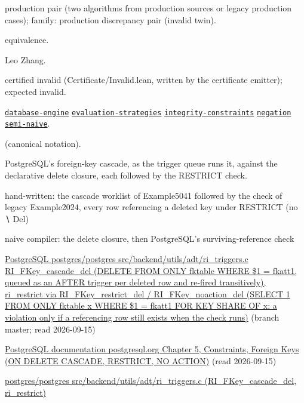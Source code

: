 \documentclass[10pt]{article}
\begin{document}
\begin{description}[leftmargin=2.6cm,style=nextline,itemsep=1pt]

\item[Category] production pair (two algorithms from production sources or legacy production cases); family: production discrepancy pair (invalid twin).

\item[Kind] equivalence.

\item[Contributors] Leo Zhang.

\item[Status] certified invalid (Certificate/Invalid.lean, written by the certificate emitter); expected invalid.

\item[Tags] \hyperref[tag:database-engine]{\texttt{database-engine}} \hyperref[tag:evaluation-strategies]{\texttt{evaluation-strategies}} \hyperref[tag:integrity-constraints]{\texttt{integrity-constraints}} \hyperref[tag:negation]{\texttt{negation}} \hyperref[tag:semi-naive]{\texttt{semi-naive}}.

\item[Input]  (canonical notation).

\item[Summary] PostgreSQL's foreign-key cascade, as the trigger queue runs it, against the declarative delete closure, each followed by the RESTRICT check.

\item[Sides] hand-written: the cascade worklist of Example5041 followed by the check of legacy Example2024, every row referencing a deleted key under RESTRICT (no ∖ Del) \par naive compiler: the delete closure, then PostgreSQL's surviving-reference check

\item[Sources] {\raggedright \href{https://github.com/postgres/postgres/blob/master/src/backend/utils/adt/ri_triggers.c}{PostgreSQL postgres/postgres src/backend/utils/adt/ri\_triggers.c RI\_FKey\_cascade\_del (DELETE FROM ONLY fktable WHERE \$1 = fkatt1, queued as an AFTER trigger per deleted row and re-fired transitively), ri\_restrict via RI\_FKey\_restrict\_del / RI\_FKey\_noaction\_del (SELECT 1 FROM ONLY fktable x WHERE \$1 = fkatt1 FOR KEY SHARE OF x: a violation only if a referencing row still exists when the check runs)} (branch master; read 2026-09-15) \par \href{https://www.postgresql.org/docs/current/ddl-constraints.html}{PostgreSQL documentation postgresql.org Chapter 5, Constraints, Foreign Keys (ON DELETE CASCADE, RESTRICT, NO ACTION)} (read 2026-09-15) \par \href{https://github.com/postgres/postgres/blob/master/src/backend/utils/adt/ri_triggers.c}{postgres/postgres src/backend/utils/adt/ri\_triggers.c (RI\_FKey\_cascade\_del, ri\_restrict)}\par}


\end{description}
\end{document}
